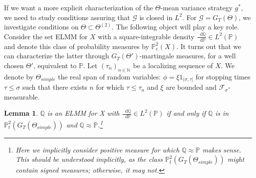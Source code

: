 \documentclass[11pt,a4paper,twoside,openany]{report}
\newcommand{\diff}{\mathop{}\!\mathrm{d}}
\theoremstyle{plain} %
\newtheorem{lemma}[lemma]{Lemma}
\theoremstyle{definition} %
\theoremstyle{remark} %
\begin{document}
If we want a more explicit characterization of the \(\Theta\)-mean variance strategy \(g^*\), we need to study conditions assuring that \(\mathcal{G}\) is closed in \(L^2\). For \(\mathcal{G}=G_T(\Theta)\), we investigate conditions on \(\Theta\subset\Theta^{(2)}\). The following object will play a key role. 
\bigbreak
Consider the set ELMM for \(X\) with a square-integrable density \(\frac{\diff \mathbb{Q}}{\diff \mathbb{P}}\in L^2(\mathbb{P})\) and denote this class of probability measures by \(\mathbb{\mathbb{P}}_{e}^2(X)\). It turns out that we can characterize the latter through \(G_T(\Theta')\)-martingale measures, for a well chosen \(\Theta'\), equivalent to \(\mathbb{P}\). Let \((\tau_n)_{n\in\mathbb{N}}\) be a localizing sequence of \(X\). We denote by \(\Theta_{simple}\) the real span of random variables: \(\phi=\xi 1_{(\sigma,\tau]}\) for stopping times \(\tau\leq\sigma\) such that there exists \(n\) for which \(\tau\leq\tau_n\) and \(\xi\) are bounded and \(\mathcal{F}_{\sigma}\)-measurable. 
\begin{lemma}\label{lemma:ELMM and P_e^2(X)}
    \(\mathbb{Q}\) is an ELMM for X with \(\frac{\diff \mathbb{Q}}{\diff \mathbb{P}}\in L^2(\mathbb{P})\) if and only if \(\mathbb{Q}\) is in \(\mathbb{P}_t^2(G_T(\Theta_{simple}))\) and \(\mathbb{Q}\approx \mathbb{P}\).\footnote{Here we implicitly consider positive measure for which \(\mathbb{Q}\approx \mathbb{P}\) makes sense. This should be understood implicitly, as the class \(\mathbb{P}_t^2(G_T(\Theta_{simple}))\) might contain signed measures; otherwise, it may not.}
\end{lemma}
\end{document}
